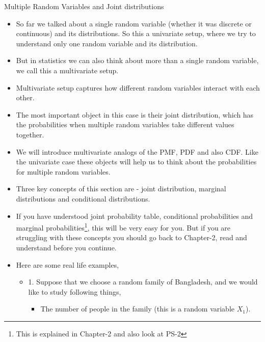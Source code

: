 \documentclass[8pt, usepdftitle = false]{beamer}
\begin{document}
\begin{frame}[allowframebreaks]{Multiple Random Variables and Joint distributions}

\begin{itemize}
  \item So far we talked about a single random variable (whether it was discrete or continuous) and its distributions. So this a \alert{univariate} setup, where we try to understand only one random variable and its distribution.

  \item But in statistics we can also think about more than a single random variable, we call this a \alert{multivariate} setup. 

  \item Multivariate setup captures how different random variables interact with each other. 

  \item The most important object in this case is their \alert{joint distribution}, which has the probabilities when multiple random variables take different values together. 


  \item We will introduce multivariate analogs of the PMF, PDF and also CDF. Like the univariate case these objects will help us to think about the probabilities for multiple random variables.

  \item Three key concepts of this section are - \alert{joint distribution, marginal distributions} and \alert{conditional distributions}.

  \item If you have understood joint probability table, conditional probabilities and marginal probabilities\footnote[frame]{This is explained in Chapter-2 and also look at PS-2}, this will be very easy for you. But if you are struggling with these concepts you should go back to Chapter-2, read and understand before you continue. 


  \item Here are some real life examples,

  \begin{itemize}
    \item 1. Suppose that we choose a \alert{random family} of Bangladesh, and we would like to study following things,

    \begin{itemize}
      \item The number of people in the family (this is a random variable $X_1$).


\end{itemize}
\end{itemize}
\end{itemize}
\end{frame}
\end{document}
